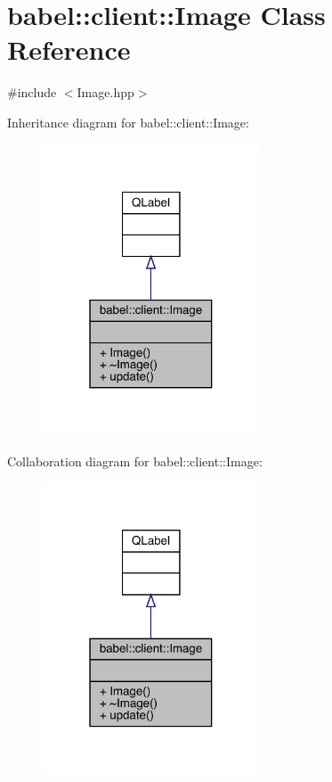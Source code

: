 \hypertarget{classbabel_1_1client_1_1_image}{}\section{babel\+:\+:client\+:\+:Image Class Reference}
\label{classbabel_1_1client_1_1_image}


{\ttfamily \#include $<$Image.\+hpp$>$}



Inheritance diagram for babel\+:\+:client\+:\+:Image\+:\nopagebreak
\begin{figure}[H]
\begin{center}
\leavevmode
\includegraphics[width=183pt]{classbabel_1_1client_1_1_image__inherit__graph}
\end{center}
\end{figure}


Collaboration diagram for babel\+:\+:client\+:\+:Image\+:\nopagebreak
\begin{figure}[H]
\begin{center}
\leavevmode
\includegraphics[width=183pt]{classbabel_1_1client_1_1_image__coll__graph}
\end{center}
\end{figure}
